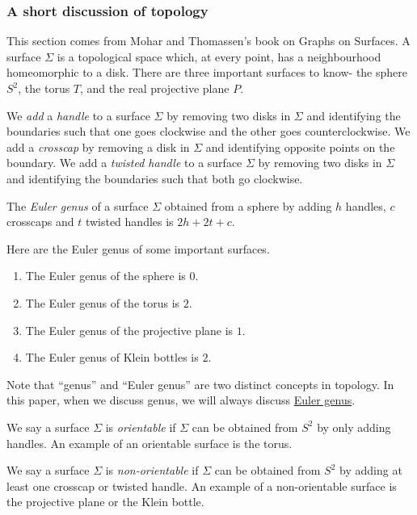\subsubsection{A short discussion of topology}\label{sssec:topology}
This section comes from Mohar and Thomassen's book on Graphs on Surfaces. \cite{moharGraphsSurfaces2001} A surface $\Sigma$ is a topological space which, at every point, has a neighbourhood homeomorphic to a disk. There are three important surfaces to know- the sphere $S^2$, the torus $T$, and the real projective plane $P$.
\par
We \textit{add} a \textit{handle} to a surface $\Sigma$ by removing two disks in $\Sigma$ and identifying the boundaries such that one goes clockwise and the other goes counterclockwise. We add a \textit{crosscap} by removing a disk in $\Sigma$ and identifying opposite points on the boundary. We add a \textit{twisted handle} to a surface $\Sigma$ by removing two disks in $\Sigma$ and identifying the boundaries such that both go clockwise.
\par
\begin{definition}
	The \textit{Euler genus} of a surface $\Sigma$ obtained from a sphere by adding $h$ handles, $c$ crosscaps and $t$ twisted handles is $2h + 2t + c$.
\end{definition}

\begin{example}
	Here are the Euler genus of some important surfaces.
	\begin{enumerate}
		\item The Euler genus of the sphere is $0$.
		\item The Euler genus of the torus is $2$.
		\item The Euler genus of the projective plane is $1$. 
		\item The Euler genus of Klein bottles is $2$. 
	\end{enumerate}
\end{example}

Note that ``genus'' and ``Euler genus'' are two distinct concepts in topology. In this paper, when we discuss genus, we will always discuss \underline{Euler genus}.

We say a surface $\Sigma$ is \textit{orientable} if $\Sigma$ can be obtained from $S^2$ by only adding handles. An example of an orientable surface is the torus.

We say a surface $\Sigma$ is \textit{non-orientable} if $\Sigma$ can be obtained from $S^2$ by adding at least one crosscap or twisted handle. An example of a non-orientable surface is the projective plane or the Klein bottle. 


